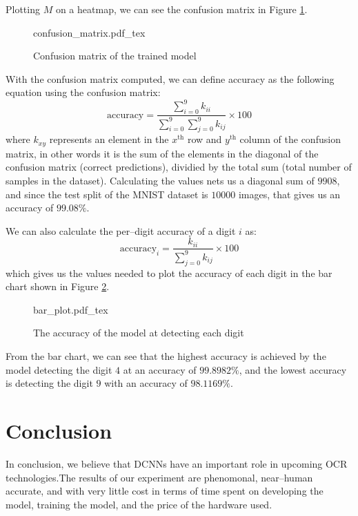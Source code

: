 \documentclass[conference]{IEEEtran}
\begin{document}
Plotting $M$ on a heatmap, we can see the confusion matrix in Figure \ref{fig:confusion_matrix}.
\begin{figure}[!htp]
    \centering
    \def\svgwidth{\columnwidth}
    \scriptsize
    {confusion_matrix.pdf_tex}
    \caption{Confusion matrix of the trained model}\label{fig:confusion_matrix}
\end{figure}
\par With the confusion matrix computed, we can define accuracy as the following equation using the confusion matrix:
\begin{equation}
    \text{accuracy} = \frac{\sum_{i = 0}^9 k_{ii}}{\sum_{i = 0}^9 \sum_{j = 0}^9 k_{ij}} \times 100
\end{equation}
where $k_{xy}$ represents an element in the $x^\text{th}$ row and $y^\text{th}$ column of the confusion matrix, in other words it is the sum of the elements in the diagonal of the confusion matrix (correct predictions), dividied by the total sum (total number of samples in the dataset). Calculating the values nets us a diagonal sum of $9908$, and since the test split of the MNIST dataset is $10000$ images, that gives us an accuracy of $99.08\%$.
\par
We can also calculate the per--digit accuracy of a digit $i$ as:
\begin{equation}
    \text{accuracy}_{i} = \frac{k_{ii}}{\sum_{j = 0}^9 k_{ij}} \times 100
\end{equation}
which gives us the values needed to plot the accuracy of each digit in the bar chart shown in Figure \ref{fig:bar}.
\begin{figure}[!htp]
    \centering
    \def\svgwidth{\columnwidth}
    {bar_plot.pdf_tex}
    \caption{The accuracy of the model at detecting each digit}\label{fig:bar}
\end{figure}
\par From the bar chart, we can see that the highest accuracy is achieved by the model detecting the digit $4$ at an accuracy of $99.8982\%$, and the lowest accuracy is detecting the digit $9$ with an accuracy of $98.1169\%$.
\section{Conclusion}
In conclusion, we believe that DCNNs have an important role in upcoming OCR technologies.\@ The results of our experiment are phenomonal, near--human accurate, and with very little cost in terms of time spent on developing the model, training the model, and the price of the hardware used.\@



\end{document}
